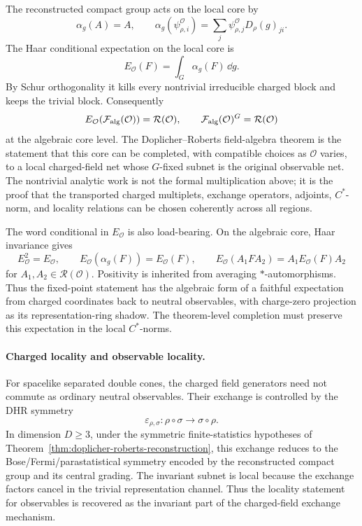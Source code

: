 The reconstructed compact group acts on the local core by
\[
  \alpha_g(A)=A,\qquad
  \alpha_g(\psi_{\rho,i}^{\mathcal O})
  =
  \sum_j\psi_{\rho,j}^{\mathcal O}D_\rho(g)_{ji}.
\]
The Haar conditional expectation on the local core is
\begin{equation}
  E_{\mathcal O}(F)
  =
  \int_G\alpha_g(F)\,\dd g.
  \label{eq:dr-local-haar-expectation}
\end{equation}
By Schur orthogonality it kills every nontrivial irreducible charged block and
keeps the trivial block.  Consequently
\[
  E_{\mathcal O}(\mathcal F_{\rm alg}(\mathcal O))
  =
  \mathcal R(\mathcal O),
  \qquad
  \mathcal F_{\rm alg}(\mathcal O)^G=\mathcal R(\mathcal O)
\]
at the algebraic core level.  The Doplicher--Roberts field-algebra theorem is
the statement that this core can be completed, with compatible choices as
\(\mathcal O\) varies, to a local charged-field net whose \(G\)-fixed subnet
is the original observable net.  The nontrivial analytic work is not the
formal multiplication above; it is the proof that the transported charged
multiplets, exchange operators, adjoints, \(C^*\)-norm, and locality relations
can be chosen coherently across all regions.

The word conditional in \(E_{\mathcal O}\) is also load-bearing.  On the
algebraic core, Haar invariance gives
\[
  E_{\mathcal O}^2=E_{\mathcal O},\qquad
  E_{\mathcal O}(\alpha_g(F))=E_{\mathcal O}(F),
  \qquad
  E_{\mathcal O}(A_1FA_2)=A_1E_{\mathcal O}(F)A_2
\]
for \(A_1,A_2\in\mathcal R(\mathcal O)\).  Positivity is inherited from
averaging \(*\)-automorphisms.  Thus the fixed-point statement has the
algebraic form of a faithful expectation from charged coordinates back to
neutral observables, with charge-zero projection as its representation-ring
shadow.
The theorem-level completion must preserve this expectation in the local
\(C^*\)-norms.

\paragraph{Charged locality and observable locality.}
For spacelike separated double cones, the charged field generators need not
commute as ordinary neutral observables.  Their exchange is controlled by the
DHR symmetry
\[
  \varepsilon_{\rho,\sigma}:\rho\circ\sigma\to\sigma\circ\rho .
\]
In dimension \(D\ge3\), under the symmetric finite-statistics hypotheses of
Theorem~\ref{thm:doplicher-roberts-reconstruction}, this exchange reduces to
the Bose/Fermi/parastatistical symmetry encoded by the reconstructed compact
group and its central grading.  The invariant subnet is local because the
exchange factors cancel in the trivial representation channel.  Thus the
locality statement for observables is recovered as the invariant part of the
charged-field exchange mechanism.

